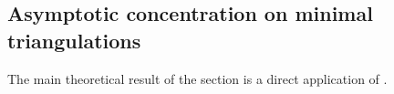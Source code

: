 \subsection{Asymptotic concentration on minimal triangulations}

The main theoretical result of the section is a direct application of \textcite{niu2020bayesian}.






